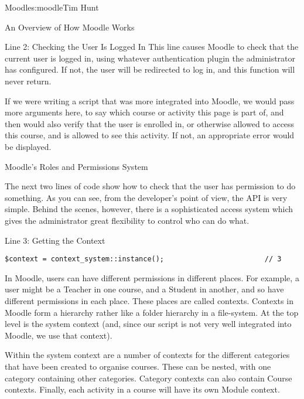 \begin{aosachapter}{Moodle}{s:moodle}{Tim Hunt}
\begin{aosasect1}{An Overview of How Moodle Works}
\begin{aosasect2}{Line 2: Checking the User Is Logged In}
This line causes Moodle to check that the current user is logged in,
using whatever authentication plugin the administrator has
configured. If not, the user will be redirected to log in, and this
function will never return.

If we were writing a script that was more integrated into Moodle, we
would pass more arguments here, to say which course or activity this
page is part of, and then  would also verify that
the user is enrolled in, or otherwise allowed to access this course,
and is allowed to see this activity. If not, an appropriate error
would be displayed.

\end{aosasect2}

\end{aosasect1}

\begin{aosasect1}{Moodle's Roles and Permissions System}

The next two lines of code show how to check that the user has
permission to do something. As you can see, from the developer's point
of view, the API is very simple. Behind the scenes, however, there is
a sophisticated access system which gives the administrator great
flexibility to control who can do what.

\begin{aosasect2}{Line 3: Getting the Context}

\begin{verbatim}
$context = context_system::instance();                        // 3
\end{verbatim}

In Moodle, users can have different permissions in different
places. For example, a user might be a Teacher in one course, and a
Student in another, and so have different permissions in each
place. These places are called contexts. Contexts in Moodle form a
hierarchy rather like a folder hierarchy in a file-system. At the top
level is the system context (and, since our script is not very well
integrated into Moodle, we use that context).

Within the system context are a number of contexts for the different
categories that have been created to organise courses. These can be
nested, with one category containing other categories. Category
contexts can also contain Course contexts. Finally, each activity in a
course will have its own Module context.



\end{aosasect2}
\end{aosasect1}
\end{aosachapter}
